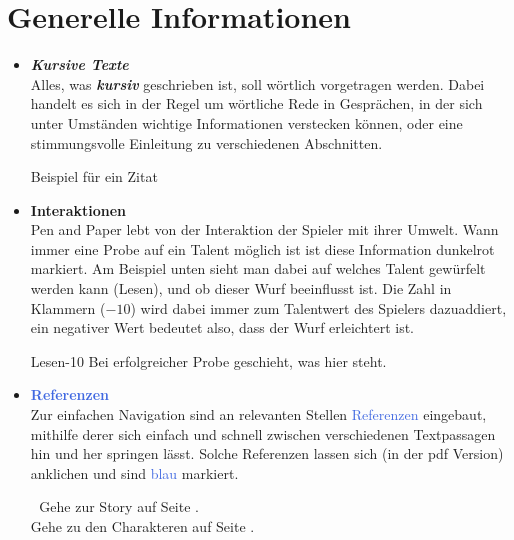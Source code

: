 \thispagestyle{fancy-info}
\section*{Generelle Informationen}

\begin{itemize}
  \item \textbf{\textit{Kursive Texte}} \\
  Alles, was \textbf{\textit{kursiv}} geschrieben ist, soll wörtlich vorgetragen werden. Dabei handelt es sich in der Regel
  um wörtliche Rede in Gesprächen, in der sich unter Umständen wichtige Informationen verstecken können, oder eine
  stimmungsvolle Einleitung zu verschiedenen Abschnitten.

  \say
  Beispiel für ein Zitat
  \endsay

  \item \textcolor{RoyalRed}{\textbf{Interaktionen}} \\
  Pen and Paper lebt von der \textcolor{RoyalRed}{Interaktion} der Spieler mit ihrer Umwelt. Wann immer eine Probe auf ein Talent
  möglich ist ist diese Information \textcolor{RoyalRed}{dunkelrot} markiert. Am Beispiel unten sieht man dabei auf welches Talent
  gewürfelt werden kann (Lesen), und ob dieser Wurf beeinflusst ist. Die Zahl in Klammern ($-10$) wird dabei immer zum Talentwert
  des Spielers dazuaddiert, ein negativer Wert bedeutet also, dass der Wurf erleichtert ist.

  \begin{probe}{Lesen}{-10}
  Bei erfolgreicher Probe geschieht, was hier steht.
  \end{probe}
  \vspace{-5pt}

  \item \textcolor{RoyalBlue}{\textbf{Referenzen}} \\
  Zur einfachen Navigation sind an relevanten Stellen \textcolor{RoyalBlue}{Referenzen} eingebaut, mithilfe derer sich einfach und
  schnell zwischen verschiedenen Textpassagen hin und her springen lässt. Solche Referenzen lassen sich (in der pdf
  Version) anklichen und sind \textcolor{RoyalBlue}{blau} markiert.

  \vspace{-5pt}
  \begin{refbox}{\chaptername$\;$\thechapter}
      Gehe zur Story auf Seite \textcolor{RoyalBlue}{\pageref{adv-start}}. \\
      Gehe zu den Charakteren auf Seite \textcolor{RoyalBlue}{\pageref{char-start}}.
  \end{refbox}
  \vspace{-5pt}


\end{itemize}
